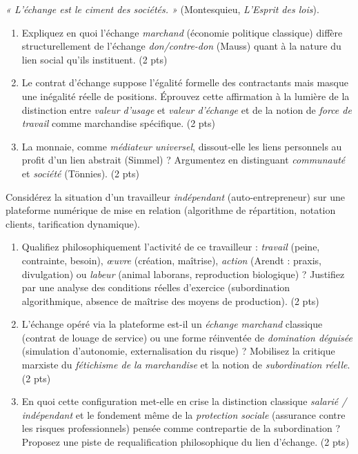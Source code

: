 \documentclass[11pt]{article}
\begin{document}
\begin{exercice}
\emph{« L'échange est le ciment des sociétés. »} (Montesquieu, \emph{L'Esprit des lois}). 
\begin{enumerate}
    \item Expliquez en quoi l'échange \emph{marchand} (économie politique classique) diffère structurellement de l'échange \emph{don/contre-don} (Mauss) quant à la nature du lien social qu'ils instituent. \hfill (2 pts)
    \item \og Le contrat d'échange suppose l'égalité formelle des contractants mais masque une inégalité réelle de positions. \fg Éprouvez cette affirmation à la lumière de la distinction entre \emph{valeur d'usage} et \emph{valeur d'échange} et de la notion de \emph{force de travail} comme marchandise spécifique. \hfill (2 pts)
    \item La monnaie, comme \emph{médiateur universel}, dissout-elle les liens personnels au profit d'un lien abstrait (Simmel) ? Argumentez en distinguant \emph{communauté} et \emph{société} (Tönnies). \hfill (2 pts)
\end{enumerate}
\end{exercice}

\begin{exercice}
Considérez la situation d'un travailleur \emph{indépendant} (auto-entrepreneur) sur une plateforme numérique de mise en relation (algorithme de répartition, notation clients, tarification dynamique). 
\begin{enumerate}
    \item Qualifiez philosophiquement l'activité de ce travailleur : \emph{travail} (peine, contrainte, besoin), \emph{œuvre} (création, maîtrise), \emph{action} (Arendt : praxis, divulgation) ou \emph{labeur} (animal laborans, reproduction biologique) ? Justifiez par une analyse des conditions réelles d'exercice (subordination algorithmique, absence de maîtrise des moyens de production). \hfill (2 pts)
    \item L'échange opéré via la plateforme est-il un \emph{échange marchand} classique (contrat de louage de service) ou une forme réinventée de \emph{domination déguisée} (simulation d'autonomie, externalisation du risque) ? Mobilisez la critique marxiste du \emph{fétichisme de la marchandise} et la notion de \emph{subordination réelle}. \hfill (2 pts)
    \item En quoi cette configuration met-elle en crise la distinction classique \emph{salarié / indépendant} et le fondement même de la \emph{protection sociale} (assurance contre les risques professionnels) pensée comme contrepartie de la subordination ? Proposez une piste de requalification philosophique du lien d'échange. \hfill (2 pts)
\end{enumerate}
\end{exercice}
\end{document}
